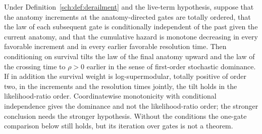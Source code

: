 \begin{proposition}\label{sch:prop:settlement}
Under Definition~\ref{sch:def:derailment} and the live-term
hypothesis, suppose that the anatomy increments at the anatomy-directed
gates are totally ordered, that the law of each subsequent gate is
conditionally independent of the past given the current anatomy, and
that the cumulative hazard is monotone decreasing in every favorable
increment and in every earlier favorable resolution time. Then
conditioning on survival tilts the law of the final anatomy upward and
the law of the crossing time to $\rho>0$ earlier in the sense of
first-order stochastic dominance. If in addition the survival weight
is log-supermodular, totally positive of order two, in the increments
and the resolution times jointly, the tilt holds in the
likelihood-ratio order. Coordinatewise monotonicity with conditional
independence gives the dominance and not the likelihood-ratio order;
the stronger conclusion needs the stronger hypothesis. Without the
conditions the one-gate comparison below still holds, but its
iteration over gates is not a theorem.
\end{proposition}

